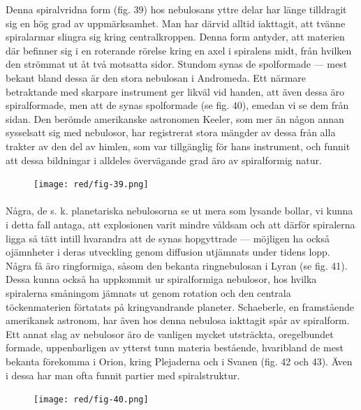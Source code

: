 \documentclass[a4paper, 12pt, oneside, swedish]{article}
\begin{document}
Denna spiralvridna form (fig. 39) hos nebulosans yttre delar har länge tilldragit sig en hög grad av uppmärksamhet. Man har därvid alltid iakttagit, att tvänne spiralarmar slingra sig kring centralkroppen. Denna form antyder, att materien där befinner sig i en roterande rörelse kring en axel i spiralens midt, från hvilken den strömmat ut åt två motsatta sidor. Stundom synas de spolformade --- mest bekant bland dessa är den stora nebulosan i Andromeda. Ett närmare betraktande med skarpare instrument ger likväl vid handen, att även dessa äro spiralformade, men att de synas spolformade (se fig. 40), emedan vi se dem från sidan. Den berömde amerikanske astronomen Keeler, som mer än någon annan sysselsatt sig med nebulosor, har registrerat stora mängder av dessa från alla trakter av den del av himlen, som var tillgänglig för hans instrument, och funnit att dessa bildningar i alldeles övervägande grad äro av spiralformig natur.

\begin{figure}[H]
\centering
\texttt{[image: red/fig-39.png]}
\caption{}
\end{figure}
\paragraph{}
Några, de s. k. planetariska nebulosorna se ut mera som lysande bollar, vi kunna i detta fall antaga, att explosionen varit mindre våldsam och att därför spiralerna ligga så tätt intill hvarandra att de synas hopgyttrade --- möjligen ha också ojämnheter i deras utveckling genom diffusion utjämnats under tidens lopp. Några få äro ringformiga, såsom den bekanta ringnebulosan i Lyran (se fig. 41). Dessa kunna också ha uppkommit ur spiralformiga nebulosor, hos hvilka spiralerna småningom jämnats ut genom rotation och den centrala töckenmaterien förtatats på kringvandrande planeter. Schaeberle, en framstående amerikansk astronom, har även hos denna nebulosa iakttagit spår av spiralform. Ett annat slag av nebulosor äro de vanligen mycket utsträckta, oregelbundet formade, uppenbarligen av ytterst tunn materia bestående, hvaribland de mest bekanta förekomma i Orion, kring Plejaderna och i Svanen (fig. 42 och 43). Även i dessa har man ofta funnit partier med spiralstruktur.

\begin{figure}[H]
\centering
\texttt{[image: red/fig-40.png]}
\caption{}
\end{figure}
\end{document}
